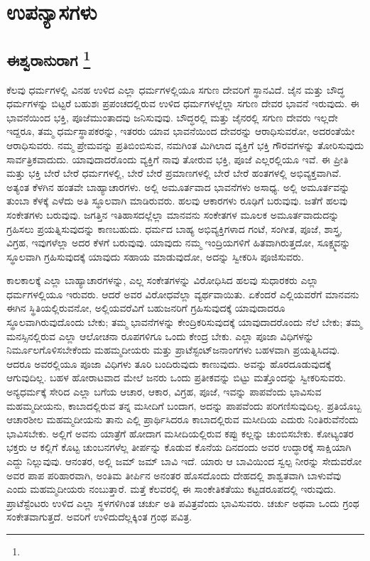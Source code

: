 

\part{ಉಪನ್ಯಾಸಗಳು}

\mainmatter

\chapter[ಈಶ್ವರಾನುರಾಗ]{ಈಶ್ವರಾನುರಾಗ \protect\footnote{}}

ಕೆಲವು ಧರ್ಮಗಳಲ್ಲಿ ವಿನಹ ಉಳಿದ ಎಲ್ಲಾ ಧರ್ಮಗಳಲ್ಲಿಯೂ ಸಗುಣ ದೇವರಿಗೆ ಸ್ಥಾನವಿದೆ. ಜೈನ ಮತ್ತು ಬೌದ್ಧ ಧರ್ಮಗಳನ್ನು ಬಿಟ್ಟರೆ ಬಹುಶಃ ಪ್ರಪಂಚದಲ್ಲಿರುವ ಉಳಿದ ಧರ್ಮಗಳಲ್ಲೆಲ್ಲಾ ಸಗುಣ ದೇವರ ಭಾವನೆ ಇರುವುದು. ಈ ಭಾವನೆಯಿಂದ ಭಕ್ತಿ, ಪೂಜೆ\break ಮುಂತಾದವು ಜನಿಸುವುವು. ಬೌದ್ಧರಲ್ಲಿ ಮತ್ತು ಜೈನರಲ್ಲಿ ಸಗುಣ ದೇವರು ಇಲ್ಲದೇ ಇದ್ದರೂ, ತಮ್ಮ ಧರ್ಮಸ್ಥಾಪಕರನ್ನು, ಇತರರು ಯಾವ ಭಾವನೆಯಿಂದ ದೇವರನ್ನು ಆರಾಧಿಸುವರೋ, ಅದರಂತೆಯೇ ಆರಾಧಿಸುವರು. ನಮ್ಮ ಪ್ರೇಮವನ್ನು ಪ್ರತಿಬಿಂಬಿಸುವ, ನಮಗಿಂತ ಮಿಗಿಲಾದ ವ್ಯಕ್ತಿಗೆ ಭಕ್ತಿ ಗೌರವಗಳನ್ನು ತೋರಿಸುವುದು ಸಾರ್ವತ್ರಿಕ\-ವಾದುದು. ಯಾವುದಾದರೊಂದು ವ್ಯಕ್ತಿಗೆ ನಾವು ತೋರುವ ಭಕ್ತಿ, ಪೂಜೆ ಎಲ್ಲರಲ್ಲಿಯೂ ಇವೆ. ಈ ಪ್ರೀತಿ ಮತ್ತು ಭಕ್ತಿ ಬೇರೆ ಬೇರೆ ಧರ್ಮಗಳಲ್ಲಿ, ಬೇರೆ ಬೇರೆ ಪ್ರಮಾಣಗಳಲ್ಲಿ ಬೇರೆ ಬೇರೆ ಹಂತಗಳಲ್ಲಿ ಅಭಿವ್ಯಕ್ತವಾಗಿವೆ. ಅತ್ಯಂತ ಕೆಳಗಿನ ಹಂತವೇ ಬಾಹ್ಯಾಚಾರಗಳು. ಅಲ್ಲಿ ಅಮೂರ್ತವಾದ ಭಾವನೆಗಳು ಅಸಾಧ್ಯ. ಅಲ್ಲಿ ಅಮೂರ್ತವನ್ನು ತುಂಬಾ ಕೆಳಕ್ಕೆ ಎಳೆದು ಅತಿ ಸ್ಥೂಲವಾಗಿ ಮಾಡಿರುವರು. ಹಲವು ಆಕಾರಗಳು ರೂಢಿಗೆ ಬರುವುವು. ಜತೆಗೆ ಹಲವು ಸಂಕೇತಗಳು ಬರುವುವು. ಜಗತ್ತಿನ ಇತಿಹಾಸದಲ್ಲೆಲ್ಲಾ ಮಾನವನು ಸಂಕೇತಗಳ ಮೂಲಕ ಅಮೂರ್ತವಾದುದನ್ನು ಗ್ರಹಿಸಲು ಪ್ರಯತ್ನಿಸುವುದನ್ನು ಕಾಣಬಹುದು. ಧರ್ಮದ ಬಾಹ್ಯ ಅಭಿವ್ಯಕ್ತಿಗಳಾದ ಗಂಟೆ, ಸಂಗೀತ, ಪೂಜೆ, ಶಾಸ್ತ್ರ, ವಿಗ್ರಹ, ಇವುಗಳೆಲ್ಲಾ ಅದರ ಕೆಳಗೆ ಬರುವುವು. ಯಾವುದು ನಮ್ಮ ಇಂದ್ರಿಯಗಳಿಗೆ ಹಿತವಾಗಿರುತ್ತದೋ, ಸೂಕ್ಷ್ಮವನ್ನು ಸ್ಥೂಲವಾಗಿ ಗ್ರಹಿಸುವುದಕ್ಕೆ ಯಾವುದು ಸಹಾಯ ಮಾಡುವುದೋ, ಅದನ್ನು ಸ್ವೀಕರಿಸಿ ಪೂಜಿಸುವರು.

ಕಾಲಕಾಲಕ್ಕೆ ಎಲ್ಲಾ ಬಾಹ್ಯಾಚಾರಗಳನ್ನು, ಎಲ್ಲ ಸಂಕೇತಗಳನ್ನು ವಿರೋಧಿಸಿದ ಹಲವು ಸುಧಾರಕರು ಎಲ್ಲಾ ಧರ್ಮಗಳಲ್ಲಿಯೂ ಇರುವರು. ಆದರೆ ಅವರ ವಿರೋಧವೆಲ್ಲಾ ವ್ಯರ್ಥ\-ವಾಯಿತು. ಏಕೆಂದರೆ ಎಲ್ಲಿಯವರೆಗೆ ಮಾನವನು ಈಗಿನ ಸ್ಥಿತಿಯಲ್ಲಿರುವನೋ, ಅಲ್ಲಿಯ\-ವರೆವಿಗೆ ಬಹುಜನರಿಗೆ ಗ್ರಹಿಸುವುದಕ್ಕೆ ಯಾವುದಾದರೂ ಸ್ಥೂಲವಾಗಿರುವುದೊಂದು ಬೇಕು; ತಮ್ಮ ಭಾವನೆಗಳನ್ನು ಕೇಂದ್ರಿಕರಿಸುವುದಕ್ಕೆ ಯಾವುದಾದರೊಂದು ನೆಲೆ ಬೇಕು; ತಮ್ಮ ಮನಸ್ಸಿನಲ್ಲಿರುವ ಎಲ್ಲಾ ಆಲೋಚನಾ ರೂಪಗಳಿಗೂ ಒಂದು ಕೇಂದ್ರ ಬೇಕು. ಎಲ್ಲಾ ಪೂಜಾ ವಿಧಿಗಳನ್ನು ನಿರ್ಮೂಲಗೊಳಿಸಬೇಕೆಂದು ಮಹಮ್ಮದೀಯರು ಮತ್ತು ಪ್ರಾಟೆಸ್ಟಂಟ್​\break ಜನಾಂಗಗಳು ಬಹಳವಾಗಿ ಪ್ರಯತ್ನಿಸಿದವು. ಆದರೂ ಅವರಲ್ಲಿಯೂ ಪೂಜಾ ವಿಧಿಗಳು ತೂರಿ ಬಂದಿರುವುದು ಕಾಣುವುದು. ಅವನ್ನು ಹೊರದೂಡುವುದಕ್ಕೆ ಆಗುವುದಿಲ್ಲ. ಬಹಳ ಹೋರಾಟವಾದ ಮೇಲೆ ಜನರು ಒಂದು ಪ್ರತೀಕವನ್ನು ಬಿಟ್ಟು ಮತ್ತೊಂದನ್ನು ಸ್ವೀಕರಿಸುವರು. ಅನ್ಯಧರ್ಮಕ್ಕೆ ಸೇರಿದ ಎಲ್ಲಾ ಬಗೆಯ ಆಚಾರ, ಆಕಾರ, ವಿಗ್ರಹ, ಪೂಜೆ, ಇವನ್ನು ಪಾಪವೆಂದು ಭಾವಿಸುವ ಮಹಮ್ಮದೀಯನು, ಕಾಬಾದಲ್ಲಿರುವ ತನ್ನ ಮಸೀದಿಗೆ ಬಂದಾಗ, ಅದನ್ನು ಪಾಪವೆಂದು ಪರಿಗಣಿಸುವುದಿಲ್ಲ. ಪ್ರತಿಯೊಬ್ಬ ಆಚಾರಶೀಲ ಮಹಮ್ಮದೀಯನು ತಾನು ಎಲ್ಲಿ ಪ್ರಾರ್ಥಿಸಿದರೂ ಕಾಬಾದಲ್ಲಿರುವ ಮಸೀದಿಯ ಎದುರು ನಿಂತಿರುವೆನೆಂದು ಭಾವಿಸಬೇಕು. ಅಲ್ಲಿಗೆ ಅವನು ಯಾತ್ರೆಗೆ ಹೋದಾಗ ಮಸೀದಿಯಲ್ಲಿರುವ ಕಪ್ಪು ಕಲ್ಲನ್ನು ಚುಂಬಿಸಬೇಕು. ಕೋಟ್ಯಂತರ ಭಕ್ತರು ಆ ಕಲ್ಲಿಗೆ ಕೊಟ್ಟ ಚುಂಬನಗಳೆಲ್ಲ ತೀರ್ಪನ್ನು ಕೊಡುವ ಕೊನೆಯ ದಿನದಂದು ಅವರ ಉದ್ಧಾರಕ್ಕೆ ಸಾಕ್ಷಿಯಾಗಿ ಎದ್ದು ನಿಲ್ಲುವುವು. ಆನಂತರ, ಅಲ್ಲಿ ಜಮ್​ ಜಮ್​ ಬಾವಿ ಇದೆ. ಯಾರು ಆ ಬಾವಿಯಿಂದ ಸ್ವಲ್ಪ ನೀರನ್ನು ಸೇದುವರೋ ಅವರ ಪಾಪ ಪರಿಹಾರವಾಗಿ, ಅಂತಿಮ ತೀರ್ಪಿನ ಅನಂತರ ಹೊಸದೊಂದು ದೇಹದಲ್ಲಿ ಶಾಶ್ವತವಾಗಿ ಬಾಳುವೆವು ಎಂದು ಮಹಮ್ಮದೀಯರು ನಂಬುತ್ತಾರೆ. ಮತ್ತೆ ಕೆಲವರಲ್ಲಿ ಈ ಸಾಂಕೇತಿಕತೆಯು ಕಟ್ಟಡರೂಪದಲ್ಲಿ ಇರುವುದು. ಪ್ರಾಟೆಸ್ಟೆಂಟರು ಉಳಿದ ಎಲ್ಲಾ ಸ್ಥಳಗಳಿಗಿಂತ ಚರ್ಚು ಅತಿ ಪವಿತ್ರವೆಂದು ಭಾವಿಸುವರು. ಚರ್ಚು ಅಥವಾ ಒಂದು ಗ್ರಂಥ ಸಂಕೇತವಾಗುತ್ತದೆ. ಅವರಿಗೆ ಉಳಿದುದೆಲ್ಲಕ್ಕಿಂತ ಗ್ರಂಥ ಪವಿತ್ರ.

